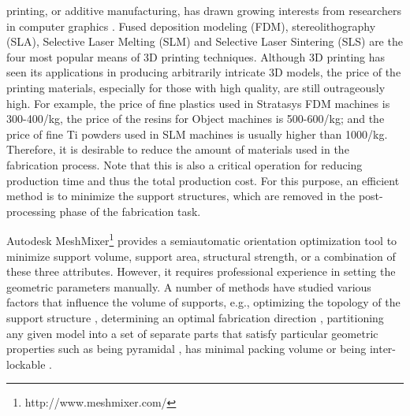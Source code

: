 


 printing, or additive manufacturing, has drawn growing interests from researchers in computer graphics \cite{livesu20173d}. Fused deposition modeling (FDM), stereolithography (SLA), Selective Laser Melting (SLM) and Selective Laser Sintering (SLS) are the four most popular means of 3D printing techniques. Although 3D printing has seen its applications in producing arbitrarily intricate 3D models, the price of the printing materials, especially for those with high quality, are still outrageously high. For example, the price of fine plastics used in Stratasys FDM machines is 300-400\textdollar /kg, the price of the resins for Object machines is 500-600\textdollar /kg; and the price of fine Ti powders used in SLM machines is usually higher than 1000\textdollar /kg. Therefore, it is desirable to reduce the amount of materials used in the fabrication process. Note that this is also a critical operation for reducing production time and thus the total production cost. For this purpose, an efficient method is to minimize the support structures, which are removed in the post-processing phase of the fabrication task.

Autodesk MeshMixer\footnote{http://www.meshmixer.com/} provides a semiautomatic orientation optimization tool to minimize support volume, support area, structural strength, or a combination of these three attributes. However, it requires professional experience in setting the geometric parameters manually. A number of methods have studied various factors that influence the volume of supports, e.g., optimizing the topology of the support structure \cite{DumasHL14,VanekGB14}, determining an optimal fabrication direction \cite{Zhang:2015,HildebrandBA13,padhye2011multi}, partitioning any given model into a set of separate parts that satisfy particular geometric properties such as being pyramidal \cite{Hu_siga14}, has minimal packing volume \cite{VanekGBMCSM14} or being inter-lockable \cite{SongFLF15}.



